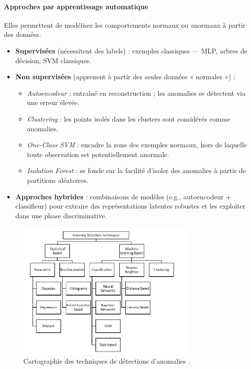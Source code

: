 \documentclass[a4paper,12pt]{report}
\begin{document}
\paragraph{Approches par apprentissage automatique}  
Elles permettent de modéliser les comportements normaux ou anormaux à partir des données.

\begin{itemize}
  \item \textbf{Supervisées} (nécessitent des labels) : exemples classiques — MLP, arbres de décision, SVM classiques.
  \item \textbf{Non supervisées} (apprenent à partir des seules données « normales ») :
    \begin{itemize}
      \item \emph{Autoencodeur} : entraîné en reconstruction ; les anomalies se détectent via une erreur élevée.
      \item \emph{Clustering} : les points isolés dans les clusters sont considérés comme anomalies.
      \item \emph{One-Class SVM} : encadre la zone des exemples normaux, hors de laquelle toute observation est potentiellement anormale.
      \item \emph{Isolation Forest} : se fonde sur la facilité d’isoler des anomalies à partir de partitions aléatoires.
    \end{itemize}
  \item \textbf{Approches hybrides} : combinaisons de modèles (e.g., autoencodeur + classifieur) pour extraire des représentations latentes robustes et les exploiter dans une phase discriminative.
\end{itemize}

\begin{figure}[H]
\centering
\includegraphics[width=0.8\textwidth]{images/anomalies_detections_technics.png}
\caption{Cartographie des techniques de détections d'anomalies \cite{muruti2023_detectio_anomalies_generalite}.}
\label{fig:anomalies_cartografic}
\end{figure}
\end{document}
